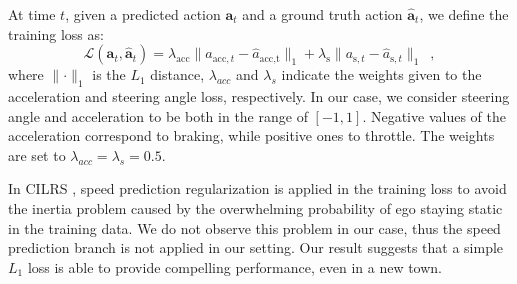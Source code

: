 %


At time $t$, given a predicted action $\mathbf{a}_{t}$ and a ground truth action $\hat{\mathbf{a}}_{t}$, we define the training loss as:
\begin{equation}\label{eq:loss}
	\mathcal{L}(\mathbf{a}_t, \hat{\mathbf{a}}_t) = \lambda_{\text{acc}}\lVert a_{\text{acc},t}-\hat{a}_{\text{acc,t}}\rVert_{1} + \lambda_{\text{s}} \lVert a_{\text{s},t}-\hat{a}_{\text{s},t} \rVert_{1} \enspace ,
\end{equation}
where $\lVert\cdot\rVert_{1}$ is the $L_1$ distance, $\lambda_{acc}$ and $\lambda_s$ indicate the weights given to the acceleration and steering angle loss, respectively. 
In our case, we consider steering angle and acceleration to be both in the range of $[-1, 1]$. 
Negative values of the acceleration correspond to braking, while positive ones to throttle.
The weights are set to $\lambda_{acc} = \lambda_{s} = 0.5$. 


In CILRS \cite{Codevilla:2019}, speed prediction regularization is applied in the training loss to avoid the inertia problem caused by the overwhelming probability of ego staying static in the training data. 
We do not observe this problem in our case, thus the speed prediction branch is not applied in our setting. 
Our result suggests that a simple $L_1$ loss is able to provide compelling performance, even in a new town.


